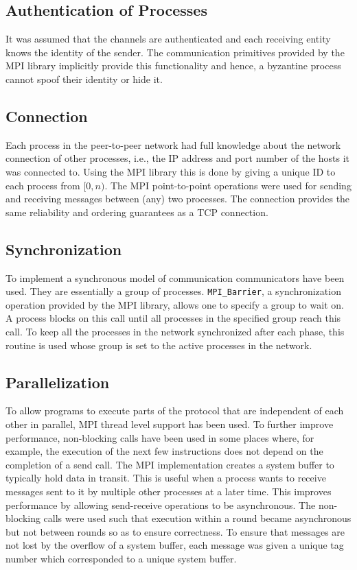 \subsection{Authentication of Processes} It was assumed that the channels are
authenticated and each receiving entity knows the identity of the sender. The
communication primitives provided by the MPI library implicitly provide this
functionality and hence, a byzantine process cannot spoof their identity or
hide it.

\subsection{Connection} Each process in the peer-to-peer network had full
knowledge about the network connection of other processes, i.e., the IP address
and port number of the hosts it was connected to. Using the MPI library this is
done by giving a unique ID to each process from $[0, n)$. The MPI
    point-to-point operations were used for sending and receiving messages
    between (any) two processes. The connection provides the same reliability and ordering guarantees as a TCP connection.

\subsection{Synchronization} To implement a synchronous model of communication
communicators have been used. They are essentially a group of processes.
\texttt{MPI\_Barrier}, a synchronization operation provided by the MPI library,
allows one to specify a group to wait on. A process blocks on this call until
all processes in the specified group reach this call. To keep all the processes
in the network synchronized after each phase, this routine is used whose group
is set to the active processes in the network.

\subsection{Parallelization} To allow programs to execute parts of the protocol
that are independent of each other in parallel, MPI thread level support has
been used. To further improve performance, non-blocking calls have been used in
some places where, for example, the execution of the next few instructions does
not depend on the completion of a send call. The MPI implementation creates
a system buffer to typically hold data in transit. This is useful when
a process wants to receive messages sent to it by multiple other processes at
a later time. This improves performance by allowing send-receive operations to
be asynchronous. The non-blocking calls were used such that execution within
a round became asynchronous but not between rounds so as to ensure correctness.
To ensure that messages are not lost by the overflow of a system buffer, each
message was given a unique tag number which corresponded to a unique system
buffer.


